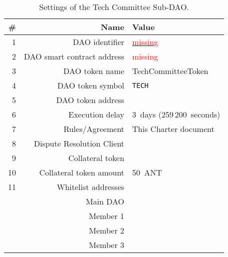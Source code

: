 \begin{table}[h!]
	\caption{Settings of the Tech Committee Sub-DAO.}
	\centering
	\begin{tabular}{rrl}
		\toprule
		\# & Name & Value \\
		\midrule
		1 & \ac{DAO} identifier & \href{https://govern.aragon.org/\#/daos/an_tech_dao}{\textcolor{red}{missing}}\\
		2 & \ac{DAO} smart contract address & \textcolor{red}{missing}\\%
		3 & \ac{DAO} token name & TechCommitteeToken\\
		4 & \ac{DAO} token symbol & \texttt{TECH}\\
		5 & \ac{DAO} token address & \techSubDaoTokenAddr\\
		6 & Execution delay & 3~days (259\,200~seconds)\\
		7 & Rules/Agreement & This Charter document\\
		8 & Dispute Resolution Client & \aragonCourtAddr\\
		9 & Collateral token & \antTokenAddr\\
		10 & Collateral token amount & 50~\ac{ANT}\\
		11 & Whitelist addresses \\
		& Main \ac{DAO} & \mainDaoAddr\\
		& Member 1 & \techSubDaoMemberAddrI\\
		& Member 2 & \techSubDaoMemberAddrII\\
		& Member 3 & \techSubDaoMemberAddrIII\\
		\bottomrule
	\end{tabular}
\end{table}




